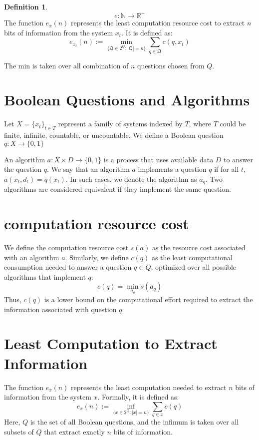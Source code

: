 \documentclass[11pt,a4paper]{article}
\theoremstyle{definition}
\newtheorem{defn}{Definition}[section]
\theoremstyle{remark}
\numberwithin{equation}{section}
\newcommand{\Real}{\mathbb R}
\newcommand{\Natural}{\mathbb N}
\begin{document}
\begin{defn}
\begin{equation}
e:\Natural \rightarrow \Real^+
\end{equation}
The function \( e_x(n) \) represents the least computation resource cost to extract \( n \) bits of information from the system \( x_t \).
It is defined as:
\begin{equation}
e_{x_t}(n) := \min_{\{\mathfrak{Q} \in 2^Q : |\mathfrak{Q}| = n\}} \sum_{q \in \mathfrak{Q}} c(q,x_t)
\end{equation}

The min is taken over all combination of $n$ questions chosen from \( Q \). 
\end{defn}



\section{Boolean Questions and Algorithms}
Let \(X = \{x_t\}_{t \in T}\) represent a family of systems indexed by \(T\), where \(T\) could be finite, infinite, countable, or uncountable. We define a Boolean question \(q: X \rightarrow \{0, 1\}\)

An algorithm \(a: X \times D \rightarrow \{0, 1\}\) is a process that uses available data \(D\) to answer the question \(q\). We say that an algorithm \(a\) implements a question \(q\) if for all \(t\), \(a(x_t, d_t) = q(x_t)\). In such cases, we denote the algorithm as \(a_q\). Two algorithms are considered equivalent if they implement the same question.

\section{computation resource cost}
We define the computation resource cost \(s(a)\) as the resource cost associated with an algorithm \(a\). Similarly, we define \(c(q)\) as the least computational consumption needed to answer a question \(q \in Q\), optimized over all possible algorithms that implement \(q\):
\[
c(q) = \min_{a_q} s(a_q)
\]
Thus, \(c(q)\) is a lower bound on the computational effort required to extract the information associated with question \(q\).

\section{Least Computation to Extract Information}
The function \(e_x(n)\) represents the least computation needed to extract \(n\) bits of information from the system \(x\). Formally, it is defined as:
\[
e_x(n) := \inf_{\{x \in 2^Q : |x|=n\}} \sum_{q \in x} c(q)
\]
Here, \(Q\) is the set of all Boolean questions, and the infimum is taken over all subsets of \(Q\) that extract exactly \(n\) bits of information.
\end{document}
